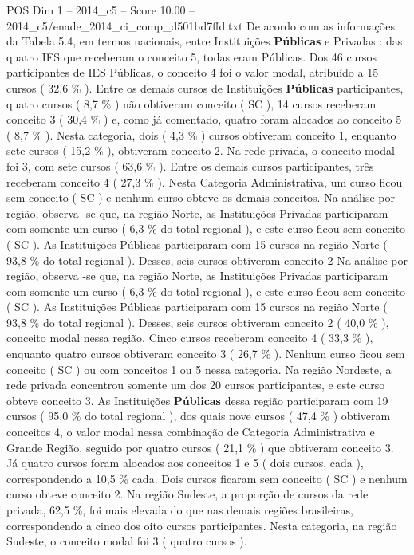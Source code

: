 \begin{textsample}{POS Dim 1 – 2014\_c5 – Score 10.00 – 2014\_c5/enade\_2014\_ci\_comp\_d501bd7ffd.txt}
De acordo com as informações da Tabela 5.4, em termos nacionais, entre Instituições \textbf{Públicas} e Privadas : das quatro IES que receberam o conceito 5, todas eram Públicas.
Dos 46 cursos participantes de IES Públicas, o conceito 4 foi o valor modal, atribuído a 15 cursos ( 32,6 \% ).
Entre os demais cursos de Instituições \textbf{Públicas} participantes, quatro cursos ( 8,7 \% ) não obtiveram conceito ( SC ), 14 cursos receberam conceito 3 ( 30,4 \% ) e, como já comentado, quatro foram alocados ao conceito 5 ( 8,7 \% ).
Nesta categoria, dois ( 4,3 \% ) cursos obtiveram conceito 1, enquanto sete cursos ( 15,2 \% ), obtiveram conceito 2.
Na rede privada, o conceito modal foi 3, com sete cursos ( 63,6 \% ).
Entre os demais cursos participantes, três receberam conceito 4 ( 27,3 \% ).
Nesta Categoria Administrativa, um curso ficou sem conceito ( SC ) e nenhum curso obteve os demais conceitos.
Na análise por região, observa -se que, na região Norte, as Instituições Privadas participaram com somente um curso ( 6,3 \% do total regional ), e este curso ficou sem conceito ( SC ).
As Instituições Públicas participaram com 15 cursos na região Norte ( 93,8 \% do total regional ).
Desses, seis cursos obtiveram conceito 2 Na análise por região, observa -se que, na região Norte, as Instituições Privadas participaram com somente um curso ( 6,3 \% do total regional ), e este curso ficou sem conceito ( SC ).
As Instituições Públicas participaram com 15 cursos na região Norte ( 93,8 \% do total regional ).
Desses, seis cursos obtiveram conceito 2 ( 40,0 \% ), conceito modal nessa região.
Cinco cursos receberam conceito 4 ( 33,3 \% ), enquanto quatro cursos obtiveram conceito 3 ( 26,7 \% ).
Nenhum curso ficou sem conceito ( SC ) ou com conceitos 1 ou 5 nessa categoria.
Na região Nordeste, a rede privada concentrou somente um dos 20 cursos participantes, e este curso obteve conceito 3.
As Instituições \textbf{Públicas} dessa região participaram com 19 cursos ( 95,0 \% do total regional ), dos quais nove cursos ( 47,4 \% ) obtiveram conceitos 4, o valor modal nessa combinação de Categoria Administrativa e Grande Região, seguido por quatro cursos ( 21,1 \% ) que obtiveram conceito 3.
Já quatro cursos foram alocados aos conceitos 1 e 5 ( dois cursos, cada ), correspondendo a 10,5 \% cada.
Dois cursos ficaram sem conceito ( SC ) e nenhum curso obteve conceito 2.
Na região Sudeste, a proporção de cursos da rede privada, 62,5 \%, foi mais elevada do que nas demais regiões brasileiras, correspondendo a cinco dos oito cursos participantes.
Nesta categoria, na região Sudeste, o conceito modal foi 3 ( quatro cursos ).

\end{textsample}
